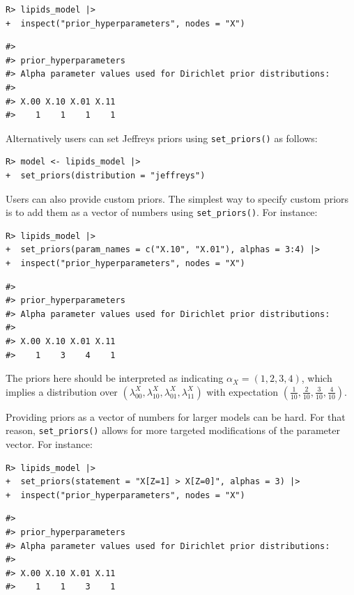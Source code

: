 \documentclass[
  11pt,
  article]{jss}
\begin{document}
\begin{verbatim}
R> lipids_model |> 
+  inspect("prior_hyperparameters", nodes = "X") 
\end{verbatim}

\begin{verbatim}
#> 
#> prior_hyperparameters
#> Alpha parameter values used for Dirichlet prior distributions:
#> 
#> X.00 X.10 X.01 X.11 
#>    1    1    1    1
\end{verbatim}

Alternatively users can set Jeffreys priors using \texttt{set\_priors()}
as follows:

\begin{verbatim}
R> model <- lipids_model |> 
+  set_priors(distribution = "jeffreys")
\end{verbatim}

Users can also provide custom priors. The simplest way to specify custom
priors is to add them as a vector of numbers using
\texttt{set\_priors()}. For instance:

\begin{verbatim}
R> lipids_model |> 
+  set_priors(param_names = c("X.10", "X.01"), alphas = 3:4) |> 
+  inspect("prior_hyperparameters", nodes = "X")
\end{verbatim}

\begin{verbatim}
#> 
#> prior_hyperparameters
#> Alpha parameter values used for Dirichlet prior distributions:
#> 
#> X.00 X.10 X.01 X.11 
#>    1    3    4    1
\end{verbatim}

The priors here should be interpreted as indicating
\(\alpha_X = (1, 2, 3, 4)\), which implies a distribution over
\((\lambda^X_{00},\lambda^X_{10}, \lambda^X_{01}, \lambda^X_{11})\) with
expectation
\(\left(\frac{1}{10}, \frac{2}{10}, \frac{3}{10}, \frac{4}{10} \right)\).

Providing priors as a vector of numbers for larger models can be hard.
For that reason, \texttt{set\_priors()} allows for more targeted
modifications of the parameter vector. For instance:

\begin{verbatim}
R> lipids_model |>
+  set_priors(statement = "X[Z=1] > X[Z=0]", alphas = 3) |>
+  inspect("prior_hyperparameters", nodes = "X")
\end{verbatim}

\begin{verbatim}
#> 
#> prior_hyperparameters
#> Alpha parameter values used for Dirichlet prior distributions:
#> 
#> X.00 X.10 X.01 X.11 
#>    1    1    3    1
\end{verbatim}
\end{document}
